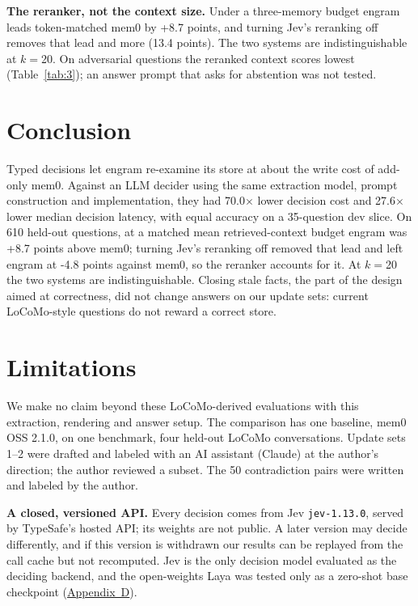 \documentclass[11pt]{article}
\newcommand{\src}[1]{}
\begin{document}
\textbf{The reranker, not the context size.} Under a three-memory budget engram leads token-matched mem0 by +8.7\src{bench/results/mem0\_token\_matched\_\_heldout\_pooled\_\_k6.json} points, and turning Jev's reranking off removes that lead and more (13.4\src{bench/results/heldout\_extra.json} points). The two systems are indistinguishable at $k{=}$20. On adversarial questions the reranked context scores lowest (Table~\ref{tab:3}); an answer prompt that asks for abstention was not tested.

\section{Conclusion}\label{sec:7}
Typed decisions let engram re-examine its store at about the write cost of add-only mem0. Against an LLM decider using the same extraction model, prompt construction and implementation, they had 70.0$\times$\src{bench/results/e2\_llm\_\_dev.json ÷ bench/results/e2\_jev\_\_dev.json} lower decision cost and 27.6$\times$\src{bench/results/e2\_llm\_\_dev.json ÷ bench/results/e2\_jev\_\_dev.json} lower median decision latency, with equal accuracy on a 35\src{bench/results/e2\_jev\_\_dev.json}-question dev slice. On 610\src{bench/results/heldout\_report.json} held-out questions, at a matched mean retrieved-context budget engram was +8.7\src{bench/results/mem0\_token\_matched\_\_heldout\_pooled\_\_k6.json} points above mem0; turning Jev's reranking off removed that lead and left engram at -4.8\src{bench/results/heldout\_extra.json} points against mem0, so the reranker accounts for it. At $k{=}$20 the two systems are indistinguishable. Closing stale facts, the part of the design aimed at correctness, did not change answers on our update sets: current LoCoMo-style questions do not reward a correct store.

\section*{Limitations}
We make no claim beyond these LoCoMo-derived evaluations with this extraction, rendering and answer setup. The comparison has one baseline, mem0 OSS 2.1.0, on one benchmark, four held-out LoCoMo conversations. Update sets 1--2 were drafted and labeled with an AI assistant (Claude) at the author's direction; the author reviewed a subset. The 50 contradiction pairs were written and labeled by the author.

\textbf{A closed, versioned API.} Every decision comes from Jev \texttt{jev-1.13.0}, served by TypeSafe's hosted API; its weights are not public. A later version may decide differently, and if this version is withdrawn our results can be replayed from the call cache but not recomputed. Jev is the only decision model evaluated as the deciding backend, and the open-weights Laya was tested only as a zero-shot base checkpoint (\hyperref[app:D]{Appendix~D}).
\end{document}
